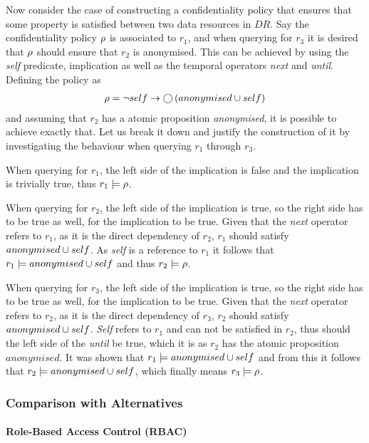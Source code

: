 \begin{example}
Now consider the case of constructing a confidentiality policy that ensures that some property is satisfied between two data resources in $DR$. Say the confidentiality policy $\rho$ is associated to $r_1$, and when querying for $r_3$ it is desired that $\rho$ should ensure that $r_2$ is anonymised. This can be achieved by using the \emph{self} predicate, implication as well as the temporal operators \emph{next} and \emph{until}. Defining the policy as 
\begin{align*}
    \rho = \lnot self \rightarrow \bigcirc \left( anonymised \cup self \right)
\end{align*}
and assuming that $r_2$ has a atomic proposition \emph{anonymised}, it is possible to achieve exactly that. Let us break it down and justify the construction of it by investigating the behaviour when querying $r_1$ through $r_3$. 

When querying for $r_1$, the left side of the implication is false and the implication is trivially true, thus $r_1 \models \rho$. 

When querying for $r_2$, the left side of the implication is true, so the right side has to be true as well, for the implication to be true. Given that the \emph{next} operator refers to $r_1$, as it is the direct dependency of $r_2$, $r_1$ should satisfy $anonymised \cup self$. As \emph{self} is a reference to $r_1$ it follows that $r_1 \models anonymised \cup self$ and thus $r_2 \models \rho$.

When querying for $r_3$, the left side of the implication is true, so the right side has to be true as well, for the implication to be true. Given that the \emph{next} operator refers to $r_2$, as it is the direct dependency of $r_3$, $r_2$ should satisfy $anonymised \cup self$. \emph{Self} refers to $r_1$ and can not be satisfied in $r_2$, thus should the left side of the \emph{until} be true, which it is as $r_2$ has the atomic proposition $anonymised$. It was shown that $r_1 \models anonymised \cup self$ and from this it follows that $r_2 \models anonymised \cup self$, which finally means $r_3 \models \rho$.
\end{example}

\subsubsection{Comparison with Alternatives}
\paragraph{Role-Based Access Control (RBAC)}
